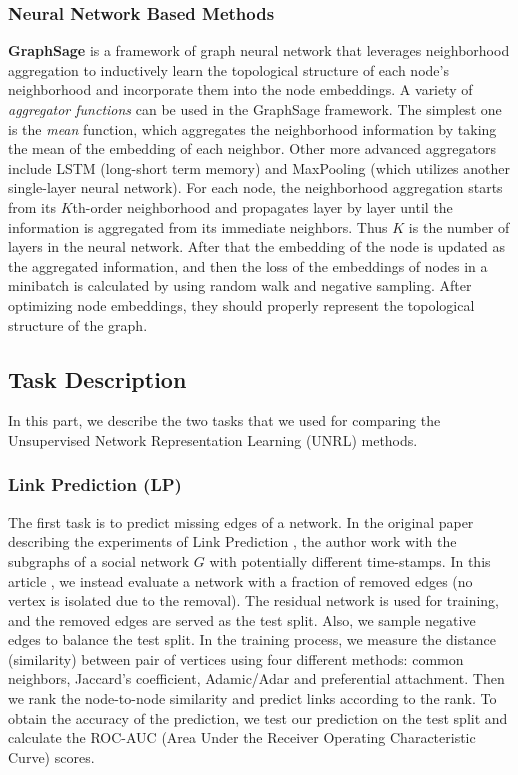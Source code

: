 \documentclass[a4paper]{article}
\begin{document}
\subsubsection{Neural Network Based Methods} %
\noindent \textbf{GraphSage} is a framework of graph neural network that leverages neighborhood aggregation to inductively learn the topological structure of each node's neighborhood and incorporate them into the node embeddings. A variety of \emph{aggregator functions} can be used in the GraphSage framework. The simplest one is the \textit{mean} function, which aggregates the neighborhood information by taking the mean of the embedding of each neighbor. Other more advanced aggregators include LSTM (long-short term memory) and MaxPooling (which utilizes another single-layer neural network). For each node, the neighborhood aggregation starts from its $K$th-order neighborhood and propagates layer by layer until the information is aggregated from its immediate neighbors. Thus $K$ is the number of layers in the neural network. After that the embedding of the node is updated as the aggregated information, and then the loss of the embeddings of nodes in a minibatch is calculated by using random walk and negative sampling. After optimizing node embeddings, they should properly represent the topological structure of the graph.

\subsection{Task Description}

\noindent In this part, we describe the two tasks that we used for comparing the Unsupervised Network Representation Learning (UNRL) methods.

\subsubsection{Link Prediction (LP)}

\noindent The first task is to predict missing edges of a network. In the original paper describing the experiments of Link Prediction \cite{g}, the author work with the subgraphs of a social network $G$ with potentially different time-stamps. In this article \cite{a}, we instead evaluate a network with a fraction of removed edges (no vertex is isolated due to the removal). The residual network is used for training, and the removed edges are served as the test split. Also, we sample negative edges to balance the test split. In the training process, we measure the distance (similarity) between pair of vertices using four different methods: common neighbors, Jaccard's coefficient, Adamic/Adar and preferential attachment. Then we rank the node-to-node similarity and predict links according to the rank. To obtain the accuracy of the prediction, we test our prediction on the test split and calculate the ROC-AUC (Area Under the Receiver Operating Characteristic Curve) scores.
\end{document}
